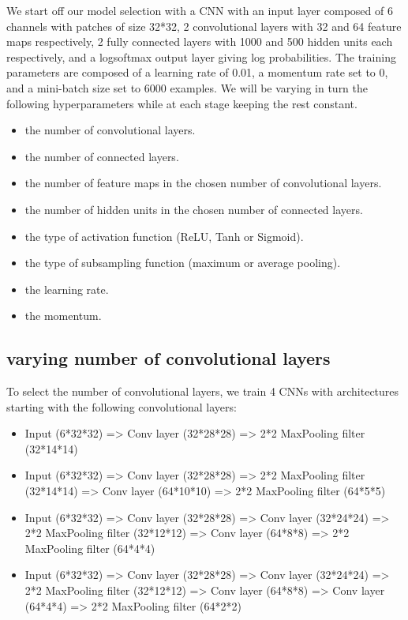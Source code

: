 \noindent We start off our model selection with a CNN with an input layer composed of 6 channels with patches of size 32*32, 2 convolutional layers with 32 and 64 feature maps respectively, 2 fully connected layers with 1000 and 500 hidden units each respectively, and a logsoftmax output layer giving log probabilities. The training parameters are composed of a learning rate of 0.01, a momentum rate set to 0, and a mini-batch size set to 6000 examples. We will be varying in turn the following hyperparameters while at each stage keeping the rest constant.\\

\begin{itemize}
	\item the number of convolutional layers.
	\item the number of connected layers.
	\item the number of feature maps in the chosen number of convolutional layers.
	\item the number of hidden units in the chosen number of connected layers.
	\item the type of activation function (ReLU, Tanh or Sigmoid).
	\item the type of subsampling function (maximum or average pooling).
	\item the learning rate.
	\item the momentum.
\end{itemize}

\subsection{varying number of convolutional layers}

\noindent To select the number of convolutional layers, we train 4 CNNs with architectures starting with the following convolutional layers:

\begin{itemize}
	\item Input (6*32*32) => Conv layer (32*28*28) => 2*2 MaxPooling filter (32*14*14) 
	\item Input (6*32*32) => Conv layer (32*28*28) => 2*2 MaxPooling filter (32*14*14) => Conv layer (64*10*10) => 2*2 MaxPooling filter (64*5*5)
	\item Input (6*32*32) => Conv layer (32*28*28) => Conv layer (32*24*24) => 2*2 MaxPooling filter (32*12*12) => Conv layer (64*8*8) => 2*2 MaxPooling filter (64*4*4)
	\item Input (6*32*32) => Conv layer (32*28*28) => Conv layer (32*24*24) => 2*2 MaxPooling filter (32*12*12) => Conv layer (64*8*8) => Conv layer (64*4*4) => 2*2 MaxPooling filter (64*2*2)
\end{itemize}

